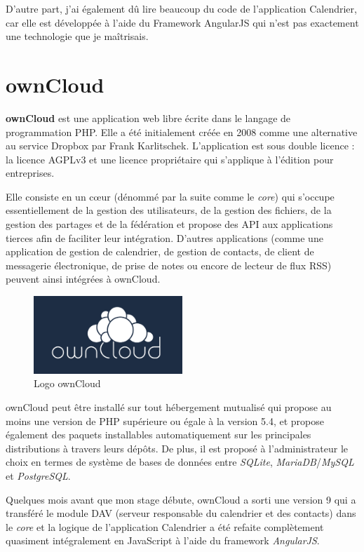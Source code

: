 \documentclass[10pt,a4paper, twoside]{report}
\begin{document}
	D'autre part, j'ai également dû lire beaucoup du code de l'application Calendrier, car elle est développée à l'aide du Framework AngularJS qui n'est pas exactement une technologie que je maîtrisais.
	
	\section{ownCloud}
	\textbf{ownCloud} est une application web libre écrite dans le langage de programmation PHP. Elle a été initialement créée en 2008 comme une alternative au service Dropbox par Frank Karlitschek. L'application est sous double licence : la licence AGPLv3 et une licence propriétaire qui s'applique à l'édition pour entreprises.
	
	Elle consiste en un cœur (dénommé par la suite comme le \textit{core}) qui s'occupe essentiellement de la gestion des utilisateurs, de la gestion des fichiers, de la gestion des partages et de la fédération et propose des API aux applications tierces afin de faciliter leur intégration. D'autres applications (comme une application de gestion de calendrier, de gestion de contacts, de client de messagerie électronique, de prise de notes ou encore de lecteur de flux RSS) peuvent ainsi intégrées à ownCloud.
	
	\begin{figure}[ht]
		\centering
		\includegraphics[width=0.5\textwidth]{images/owncloud-logo.png}
		\caption*{Logo ownCloud}
		\label{normal_case}
	\end{figure}
	
	ownCloud peut être installé sur tout hébergement mutualisé qui propose au moins une version de PHP supérieure ou égale à la version 5.4, et propose également des paquets installables automatiquement sur les principales distributions à travers leurs dépôts. De plus, il est proposé à l'administrateur le choix en termes de système de bases de données entre \textit{SQLite}, \textit{MariaDB}/\textit{MySQL} et \textit{PostgreSQL}.
	
	Quelques mois avant que mon stage débute, ownCloud a sorti une version 9 qui a transféré le module DAV (serveur responsable du calendrier et des contacts) dans le \textit{core} et la logique de l'application Calendrier a été refaite complètement quasiment intégralement en JavaScript à l'aide du framework \textit{AngularJS}.
	
\end{document}
